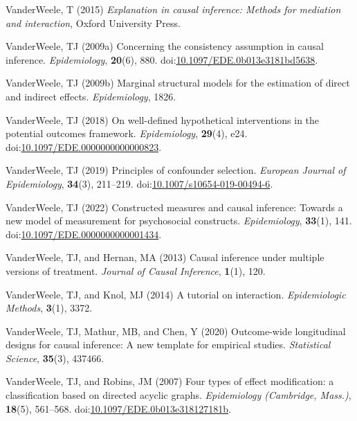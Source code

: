 \documentclass[
  singlecolumn,
  9pt]{article}
\begin{document}
\begin{CSLReferences}
VanderWeele, T (2015) \emph{Explanation in causal inference: Methods for
mediation and interaction}, Oxford University Press.

VanderWeele, TJ (2009a) Concerning the consistency assumption in causal
inference. \emph{Epidemiology}, \textbf{20}(6), 880.
doi:\href{https://doi.org/10.1097/EDE.0b013e3181bd5638}{10.1097/EDE.0b013e3181bd5638}.

VanderWeele, TJ (2009b) Marginal structural models for the estimation of
direct and indirect effects. \emph{Epidemiology}, 1826.

VanderWeele, TJ (2018) On well-defined hypothetical interventions in the
potential outcomes framework. \emph{Epidemiology}, \textbf{29}(4), e24.
doi:\href{https://doi.org/10.1097/EDE.0000000000000823}{10.1097/EDE.0000000000000823}.

VanderWeele, TJ (2019) Principles of confounder selection.
\emph{European Journal of Epidemiology}, \textbf{34}(3), 211--219.
doi:\href{https://doi.org/10.1007/s10654-019-00494-6}{10.1007/s10654-019-00494-6}.

VanderWeele, TJ (2022) Constructed measures and causal inference:
Towards a new model of measurement for psychosocial constructs.
\emph{Epidemiology}, \textbf{33}(1), 141.
doi:\href{https://doi.org/10.1097/EDE.0000000000001434}{10.1097/EDE.0000000000001434}.

VanderWeele, TJ, and Hernan, MA (2013) Causal inference under multiple
versions of treatment. \emph{Journal of Causal Inference},
\textbf{1}(1), 120.

VanderWeele, TJ, and Knol, MJ (2014) A tutorial on interaction.
\emph{Epidemiologic Methods}, \textbf{3}(1), 3372.

VanderWeele, TJ, Mathur, MB, and Chen, Y (2020) Outcome-wide
longitudinal designs for causal inference: A new template for empirical
studies. \emph{Statistical Science}, \textbf{35}(3), 437466.

VanderWeele, TJ, and Robins, JM (2007) Four types of effect
modification: a classification based on directed acyclic graphs.
\emph{Epidemiology (Cambridge, Mass.)}, \textbf{18}(5), 561--568.
doi:\href{https://doi.org/10.1097/EDE.0b013e318127181b}{10.1097/EDE.0b013e318127181b}.


\end{CSLReferences}
\end{document}
